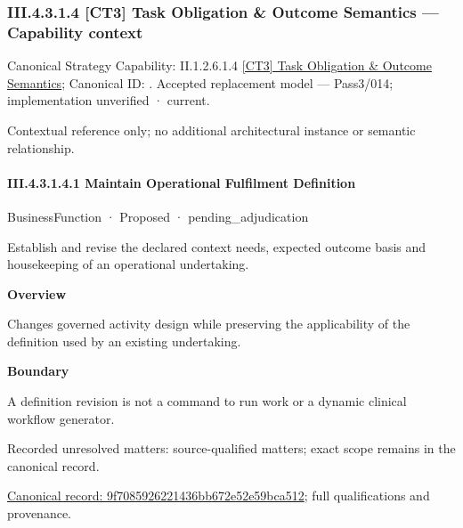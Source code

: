 \subsubsection*{III.4.3.1.4 [CT3] Task Obligation \& Outcome Semantics — Capability context}
\label{navigation:III.4.3.1.4}

{\small Canonical Strategy Capability: II.1.2.6.1.4 \hyperref[element:aa301a98cf30454889f1eec8f0a742ab]{[CT3] Task Obligation \& Outcome Semantics}; Canonical ID: \texttt{}. Accepted replacement model — Pass3/014; implementation unverified · current.}\par
Contextual reference only; no additional architectural instance or semantic relationship.\par
\paragraph*{III.4.3.1.4.1 Maintain Operational Fulfilment Definition}
\label{navigation:III.4.3.1.4.1}

\label{element:9f7085926221436bb672e52e59bca512}
{\small BusinessFunction · Proposed · pending\_adjudication}\par

Establish and revise the declared context needs, expected outcome basis and housekeeping of an operational undertaking.



\textbf{Overview}



Changes governed activity design while preserving the applicability of the definition used by an existing undertaking.



\textbf{Boundary}



A definition revision is not a command to run work or a dynamic clinical workflow generator.


{\small Recorded unresolved matters: source-qualified matters; exact scope remains in the canonical record.}\par
{\footnotesize \href{../../../../../../../../continuum/business/business-function/9f7085926221436bb672e52e59bca512.md}{Canonical record: 9f7085926221436bb672e52e59bca512}; full qualifications and provenance.}\par
